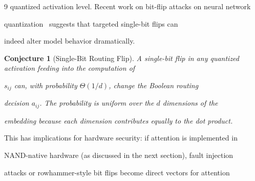 \documentclass[11pt]{article}
\newtheorem{conjecture}[theorem]{Conjecture}
\theoremstyle{definition}
\begin{document}
\begin{thebibliography}{9}
quantized activation level.  Recent work on bit-flip attacks on neural network






quantization~\cite{bitflip2023} suggests that targeted single-bit flips can






indeed alter model behavior dramatically.













\begin{conjecture}[Single-Bit Routing Flip]






A single-bit flip in any quantized activation feeding into the computation of






$s_{ij}$ can, with probability $\Theta(1/d)$, change the Boolean routing






decision $a_{ij}$.  The probability is uniform over the $d$ dimensions of the






embedding because each dimension contributes equally to the dot product.






\end{conjecture}













This has implications for hardware security: if attention is implemented in






NAND-native hardware (as discussed in the next section), fault injection






attacks or rowhammer-style bit flips become direct vectors for attention







\end{thebibliography}
\end{document}
